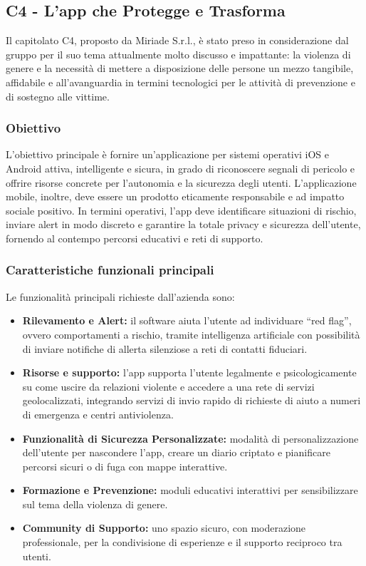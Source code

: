 \documentclass[a4paper,12pt]{article}
\begin{document}
\subsection{C4 - L'app che Protegge e Trasforma}

Il capitolato C4, proposto da Miriade S.r.l., è stato preso in considerazione dal gruppo per il suo tema attualmente molto discusso e impattante: la violenza di genere e la necessità di mettere a disposizione delle persone un mezzo tangibile, affidabile e all'avanguardia in termini tecnologici per le attività di prevenzione e di sostegno alle vittime.

\subsubsection{Obiettivo}

L'obiettivo principale è fornire un'applicazione per sistemi operativi iOS e Android attiva, intelligente e sicura, in grado di riconoscere segnali di pericolo e offrire risorse concrete per l'autonomia e la sicurezza degli utenti. L’applicazione mobile, inoltre, deve essere un prodotto eticamente responsabile e ad impatto sociale positivo. In termini operativi, l’app deve identificare situazioni di rischio, inviare alert in modo discreto e garantire la totale privacy e sicurezza dell'utente, fornendo al contempo percorsi educativi e reti di supporto.

\subsubsection{Caratteristiche funzionali principali}

Le funzionalità principali richieste dall’azienda sono:
\begin{itemize}
    \item \textbf{Rilevamento e Alert:} il software aiuta l’utente ad individuare ``red flag'', ovvero comportamenti a rischio, tramite intelligenza artificiale con possibilità di inviare notifiche di allerta silenziose a reti di contatti fiduciari.
    \item \textbf{Risorse e supporto:} l’app supporta l’utente legalmente e psicologicamente su come uscire da relazioni violente e accedere a una rete di servizi geolocalizzati, integrando servizi di invio rapido di richieste di aiuto a numeri di emergenza e centri antiviolenza.
    \item \textbf{Funzionalità di Sicurezza Personalizzate:} modalità di personalizzazione dell’utente per nascondere l’app, creare un diario criptato e pianificare percorsi sicuri o di fuga con mappe interattive.
    \item \textbf{Formazione e Prevenzione:} moduli educativi interattivi per sensibilizzare sul tema della violenza di genere.
    \item \textbf{Community di Supporto:} uno spazio sicuro, con moderazione professionale, per la condivisione di esperienze e il supporto reciproco tra utenti.
\end{itemize}
\end{document}
